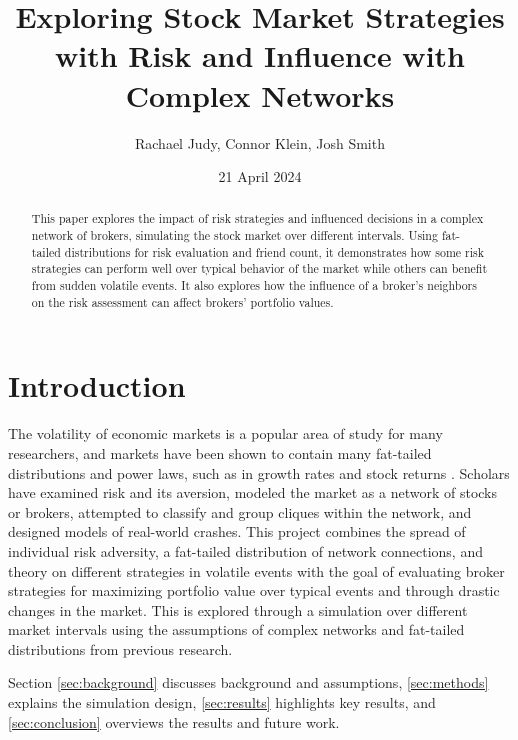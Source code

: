 \documentclass[letterpaper, 11 pt, proceedings]{IEEEtran}
\title{Exploring Stock Market Strategies with Risk and Influence with Complex Networks}
\author{Rachael Judy, Connor Klein, Josh Smith}
\date{21 April 2024}
\begin{document}
	\pgfplotsset{compat=1.18}
	
	\maketitle

	\begin{abstract}
		This paper explores the impact of risk strategies and influenced decisions in a complex network of brokers, simulating the stock market over different intervals. Using fat-tailed distributions for risk evaluation and friend count, it demonstrates how some risk strategies can perform well over typical behavior of the market while others can benefit from sudden volatile events. It also explores how the influence of a broker's neighbors on the risk assessment can affect brokers' portfolio values. 
	\end{abstract}


	\section{Introduction}\label{sec:intro}
	The volatility of economic markets is a popular area of study for many researchers, and markets have been shown to contain many fat-tailed distributions and power laws, such as in growth rates and stock returns \cite{gabaix_powerlaws}. Scholars have examined risk and its aversion, modeled the market as a network of stocks or brokers, attempted to classify and group cliques within the network, and designed models of real-world crashes. This project combines the spread of individual risk adversity, a fat-tailed distribution of network connections, and theory on different strategies in volatile \cite{taleb_antifragile} events with the goal of evaluating broker strategies for maximizing portfolio value over typical events and through drastic changes in the market. This is explored through a simulation over different market intervals using the assumptions of complex networks and fat-tailed distributions from previous research.
	
	Section \ref{sec:background} discusses background and assumptions, \ref{sec:methods} explains the simulation design, \ref{sec:results} highlights key results, and \ref{sec:conclusion} overviews the results and future work.
	
\end{document}
